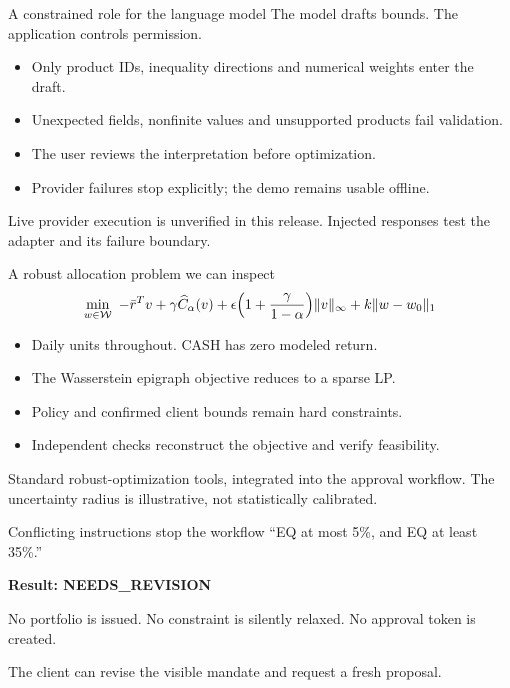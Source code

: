 \documentclass[aspectratio=169,11pt]{beamer}
\begin{document}
\begin{frame}{A constrained role for the language model}
\Large The model drafts bounds. The application controls permission.\par\vspace{7mm}
\normalsize\begin{itemize}
\item Only product IDs, inequality directions and numerical weights enter the draft.
\item Unexpected fields, nonfinite values and unsupported products fail validation.
\item The user reviews the interpretation before optimization.
\item Provider failures stop explicitly; the demo remains usable offline.
\end{itemize}
\vspace{5mm}\footnotesize Live provider execution is unverified in this release. Injected responses test the adapter and its failure boundary.
\end{frame}
\begin{frame}{A robust allocation problem we can inspect}
\[
\min_{w\in\mathcal W}\ -\bar r^Tv+\gamma\widehat C_\alpha(v)
+\epsilon\Bigl(1+\frac{\gamma}{1-\alpha}\Bigr)\|v\|_\infty
+k\|w-w_0\|_1
\]
\begin{itemize}
\item Daily units throughout. CASH has zero modeled return.
\item The Wasserstein epigraph objective reduces to a sparse LP.
\item Policy and confirmed client bounds remain hard constraints.
\item Independent checks reconstruct the objective and verify feasibility.
\end{itemize}
\vspace{3mm}\footnotesize Standard robust-optimization tools, integrated into the approval workflow. The uncertainty radius is illustrative, not statistically calibrated.
\end{frame}
\begin{frame}{Conflicting instructions stop the workflow}
\Large ``EQ at most 5\%, and EQ at least 35\%.''\par\vspace{8mm}
\normalsize
\textbf{Result: NEEDS\_REVISION}\par\vspace{4mm}
No portfolio is issued. No constraint is silently relaxed. No approval token is created.\par\vspace{7mm}
The client can revise the visible mandate and request a fresh proposal.
\end{frame}
\end{document}

